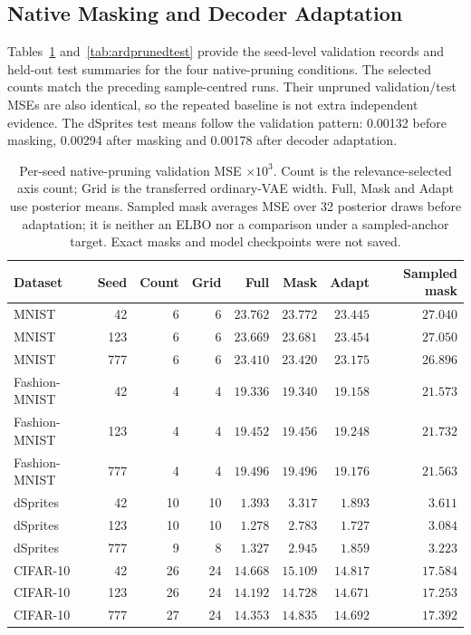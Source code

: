 \documentclass[make,article,submit,pdftex,moreauthors]{Definitions/mdpi}
\begin{document}
\subsection{Native Masking and Decoder Adaptation}
Tables~\ref{tab:ardprunedseeds} and~\ref{tab:ardprunedtest} provide
the seed-level validation records and held-out test summaries for the
four native-pruning conditions. The selected counts match the preceding
sample-centred runs. Their unpruned validation/test MSEs are also
identical, so the repeated baseline is not extra independent evidence.
The dSprites test means follow the validation pattern: 0.00132 before
masking, 0.00294 after masking and 0.00178 after decoder adaptation.
\begin{table}[H]
\caption{Per-seed native-pruning validation MSE $\times10^3$. Count is the relevance-selected axis count; Grid is the transferred ordinary-VAE width. Full, Mask and Adapt use posterior means. Sampled mask averages MSE over 32 posterior draws before adaptation; it is neither an ELBO nor a comparison under a sampled-anchor target. Exact masks and model checkpoints were not saved.}\label{tab:ardprunedseeds}
\footnotesize
\setlength{\tabcolsep}{3pt}
\begin{tabular*}{\textwidth}{@{\extracolsep{\fill}}lrrrrrrr@{}}
\toprule
Dataset & Seed & Count & Grid & Full & Mask & Adapt & Sampled mask \\
\midrule
MNIST & 42 & 6 & 6 & $23.762$ & $23.772$ & $23.445$ & $27.040$ \\
MNIST & 123 & 6 & 6 & $23.669$ & $23.681$ & $23.454$ & $27.050$ \\
MNIST & 777 & 6 & 6 & $23.410$ & $23.420$ & $23.175$ & $26.896$ \\
Fashion-MNIST & 42 & 4 & 4 & $19.336$ & $19.340$ & $19.158$ & $21.573$ \\
Fashion-MNIST & 123 & 4 & 4 & $19.452$ & $19.456$ & $19.248$ & $21.732$ \\
Fashion-MNIST & 777 & 4 & 4 & $19.496$ & $19.496$ & $19.176$ & $21.563$ \\
dSprites & 42 & 10 & 10 & $1.393$ & $3.317$ & $1.893$ & $3.611$ \\
dSprites & 123 & 10 & 10 & $1.278$ & $2.783$ & $1.727$ & $3.084$ \\
dSprites & 777 & 9 & 8 & $1.327$ & $2.945$ & $1.859$ & $3.223$ \\
CIFAR-10 & 42 & 26 & 24 & $14.668$ & $15.109$ & $14.817$ & $17.584$ \\
CIFAR-10 & 123 & 26 & 24 & $14.192$ & $14.728$ & $14.671$ & $17.253$ \\
CIFAR-10 & 777 & 27 & 24 & $14.353$ & $14.835$ & $14.692$ & $17.392$ \\
\bottomrule\end{tabular*}
\end{table}
\end{document}
